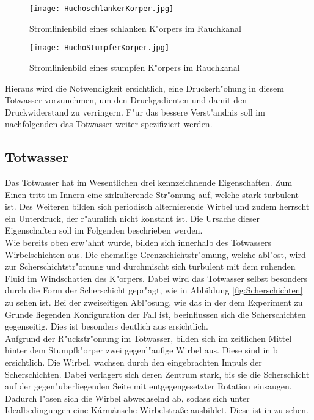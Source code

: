\begin{figure}[h]
	\centering
	\texttt{[image: HuchoschlankerKorper.jpg]}
	\caption{Stromlinienbild eines schlanken K"orpers im Rauchkanal \cite{Hucho.2011}}
	\label{fig:HuchoSchlank}
\end{figure}

\begin{figure}[h]
	\centering
	\texttt{[image: HuchoStumpferKorper.jpg]}
	\caption{Stromlinienbild eines stumpfen K"orpers im Rauchkanal \cite{Hucho.2011}}
	\label{fig:HuchoStumpf}
\end{figure}

Hieraus wird die Notwendigkeit ersichtlich, eine Druckerh"ohung in diesem Totwasser vorzunehmen, um den Druckgadienten und damit den Druckwiderstand zu verringern. F"ur das bessere Verst"andnis soll im nachfolgenden das Totwasser weiter spezifiziert werden.

\subsection{Totwasser}
\label{sec:Totwasser}
Das Totwasser hat im Wesentlichen drei kennzeichnende Eigenschaften. Zum Einen tritt im Innern eine zirkulierende Str"omung auf, welche stark turbulent ist. Des Weiteren bilden sich periodisch alternierende Wirbel und zudem herrscht ein Unterdruck, der r"aumlich nicht konstant ist. Die Ursache dieser Eigenschaften soll im Folgenden beschrieben werden. \\
Wie bereits oben erw"ahnt wurde, bilden sich innerhalb des Totwassers Wirbelschichten aus. Die ehemalige Grenzschichtstr"omung, welche abl"ost, wird zur Scherschichtstr"omung und durchmischt sich turbulent mit dem ruhenden Fluid im Windschatten des K"orpers. Dabei wird das Totwasser selbst besonders durch die Form der Scherschicht gepr"agt, wie in Abbildung \ref{fig:Scherschichten} zu sehen ist. Bei der zweiseitigen Abl"osung, wie das in der dem Experiment zu Grunde liegenden Konfiguration der Fall ist, beeinflussen sich die Scherschichten gegenseitig. Dies ist besonders deutlich aus  ersichtlich.\\
Aufgrund der R"uckstr"omung im Totwasser, bilden sich im zeitlichen Mittel hinter dem Stumpfk"orper zwei gegenl"aufige Wirbel aus. Diese sind in b ersichtlich. Die Wirbel, wachsen durch den eingebrachten Impuls der Scherschichten. Dabei verlagert sich deren Zentrum stark, bis sie die Scherschicht auf der gegen"uberliegenden Seite mit entgegengesetzter Rotation einsaugen. Dadurch l"osen sich die Wirbel abwechselnd ab, sodass sich unter Idealbedingungen eine K\'arm\'ansche Wirbelstra\ss{}e ausbildet. Diese ist in  zu sehen. \\

